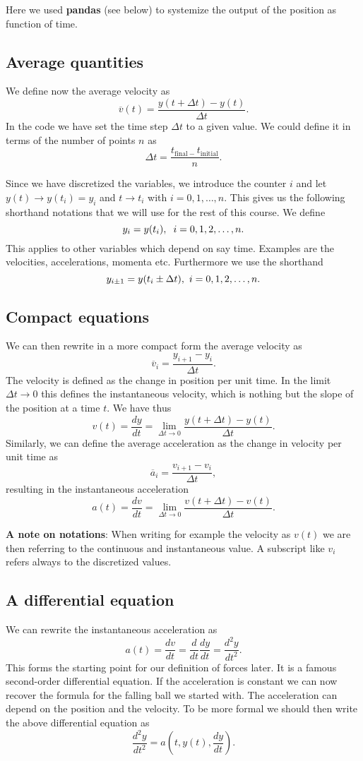 \documentclass[%
oneside,                 %
final,                   %
10pt]{article}
\begin{document}
Here we used \textbf{pandas} (see below) to systemize the output of the position as function of time.

\subsection*{Average quantities}
We define now the average velocity as
\[
\overline{v}(t) = \frac{y(t+\Delta t)-y(t)}{\Delta t}.
\]
In the code we have set the time step $\Delta t$ to a given value. We could define it in terms of the number of points $n$ as
\[
\Delta t = \frac{t_{\mathrm{final}-}t_{\mathrm{initial}}}{n}.
\]

Since we have discretized the variables, we introduce the counter $i$ and let $y(t)\rightarrow y(t_i)=y_i$ and $t\rightarrow t_i$
with $i=0,1,\dots, n$. This gives us the following shorthand notations that we will use for the rest of this course. We define
\[
y_i = y(t_i),\hspace{0.2cm} i=0,1,2,\dots,n.
\]
This applies to other variables which depend on say time. Examples are the velocities, accelerations, momenta etc.
Furthermore we use the shorthand
\[
y_{i\pm 1} = y(t_i\pm \Delta t),\hspace{0.12cm} i=0,1,2,\dots,n.
\]

\subsection*{Compact equations}
We can then rewrite in a more compact form the average velocity as
\[
\overline{v}_i = \frac{y_{i+1}-y_{i}}{\Delta t}.
\]
The velocity is defined as the change in position per unit time.
In the limit $\Delta t \rightarrow 0$ this defines the instantaneous velocity, which is nothing but the slope of the position at a time $t$.
We have thus
\[
v(t) = \frac{dy}{dt}=\lim_{\Delta t \rightarrow 0}\frac{y(t+\Delta t)-y(t)}{\Delta t}.
\]
Similarly, we can define the average acceleration as the change in velocity per unit time as
\[
\overline{a}_i = \frac{v_{i+1}-v_{i}}{\Delta t},
\]
resulting in the instantaneous acceleration
\[
a(t) = \frac{dv}{dt}=\lim_{\Delta t\rightarrow 0}\frac{v(t+\Delta t)-v(t)}{\Delta t}.
\]

\textbf{A note on notations}: When writing for example the velocity as $v(t)$ we are then referring to the continuous and instantaneous value. A subscript like
$v_i$ refers always to the discretized values.

\subsection*{A differential equation}
We can rewrite the instantaneous acceleration as
\[
a(t) = \frac{dv}{dt}=\frac{d}{dt}\frac{dy}{dt}=\frac{d^2y}{dt^2}.
\]
This forms the starting point for our definition of forces later. It is a famous second-order differential equation. If the acceleration is constant we can now recover the formula for the falling ball we started with.
The acceleration can depend on the position and the velocity. To be more formal we should then write the above differential equation as
\[
\frac{d^2y}{dt^2}=a(t,y(t),\frac{dy}{dt}).
\]
\end{document}
